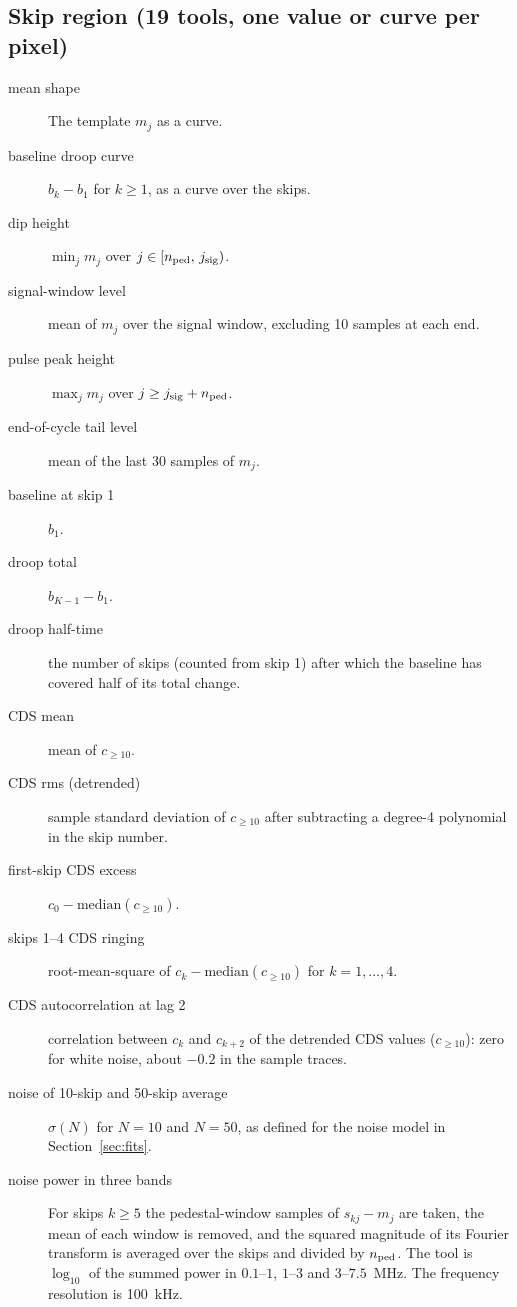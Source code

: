\documentclass[11pt]{article}
\begin{document}
\subsection{Skip region (19 tools, one value or curve per pixel)}

\begin{description}
  \item[mean shape] The template $m_j$ as a curve.
  \item[baseline droop curve] $b_k-b_1$ for $k\ge1$, as a curve over the skips.
  \item[dip height] $\min_j m_j$ over $j\in[n_{\rm ped},\,j_{\rm sig})$.
  \item[signal-window level] mean of $m_j$ over the signal window, excluding 10 samples at each end.
  \item[pulse peak height] $\max_j m_j$ over $j\ge j_{\rm sig}+n_{\rm ped}$.
  \item[end-of-cycle tail level] mean of the last 30 samples of $m_j$.
  \item[baseline at skip 1] $b_1$.
  \item[droop total] $b_{K-1}-b_1$.
  \item[droop half-time] the number of skips (counted from skip 1) after which the baseline has covered half of
        its total change.
  \item[CDS mean] mean of $c_{\ge10}$.
  \item[CDS rms (detrended)] sample standard deviation of $c_{\ge10}$ after subtracting a degree-4 polynomial in the skip number.
  \item[first-skip CDS excess] $c_0-\mathrm{median}(c_{\ge10})$.
  \item[skips 1--4 CDS ringing] root-mean-square of $c_k-\mathrm{median}(c_{\ge10})$ for $k=1,\dots,4$.
  \item[CDS autocorrelation at lag 2] correlation between $c_k$ and $c_{k+2}$ of the detrended CDS values
        ($c_{\ge10}$): zero for white noise, about $-0.2$ in the sample traces.
  \item[noise of 10-skip and 50-skip average] $\sigma(N)$ for $N=10$ and $N=50$, as defined for the noise model in
        Section~\ref{sec:fits}.
  \item[noise power in three bands] For skips $k\ge5$ the pedestal-window samples of $s_{kj}-m_j$ are taken, the
        mean of each window is removed, and the squared magnitude of its Fourier transform is averaged over
        the skips and divided by $n_{\rm ped}$. The tool is $\log_{10}$ of the summed power in
        $0.1$--$1$, $1$--$3$ and $3$--$7.5$~MHz. The frequency resolution is 100~kHz.
\end{description}
\end{document}
